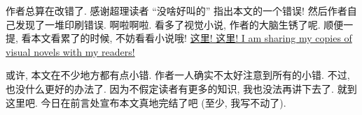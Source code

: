 \begin{remark}
    作者总算在改错了. 感谢超理读者 ``没啥好叫的'' 指出本文的一个错误! 然后作者自己发现了一堆印刷错误. 啊啦啊啦. 看多了视觉小说, 作者的大脑生锈了呢. 顺便一提, 看本文看累了的时候, 不妨看看小说哦! \hyperref{https://gitee.com/septsea/ss}{}{}{这里! 这里! I am sharing my copies of visual novels with my readers!}
\end{remark}

\begin{remark}
    或许, 本文在不少地方都有点小错. 作者一人确实不太好注意到所有的小错. 不过, 也没什么更好的办法了. 因为不假定读者有更多的知识, 我也没法再讲下去了. 就到这里吧. 今日在前言处宣布本文真地完结了吧 (至少, 我写不动了).
\end{remark}
